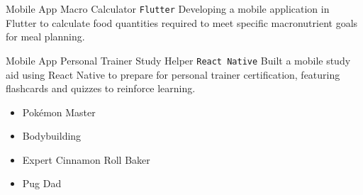 \documentclass[9pt]{developercv} %
\begin{document}

	\begin{entrylist}
        
		\entry
		{Mobile App}
		{Macro Calculator}
		{\texttt{Flutter}}
        {Developing a mobile application in Flutter to calculate food quantities required to meet specific macronutrient goals for meal planning.}
        
		\entry
		{Mobile App}
		{Personal Trainer Study Helper}
		{\texttt{React Native}}
        {Built a mobile study aid using React Native to prepare for personal trainer certification, featuring flashcards and quizzes to reinforce learning.}
        
	\end{entrylist}


	\begin{itemize}[leftmargin=*]
    
	\item[]Pokémon Master
    
	\item[]Bodybuilding
    
	\item[]Expert Cinnamon Roll Baker
    
	\item[]Pug Dad
    
	\end{itemize}
\end{document}
